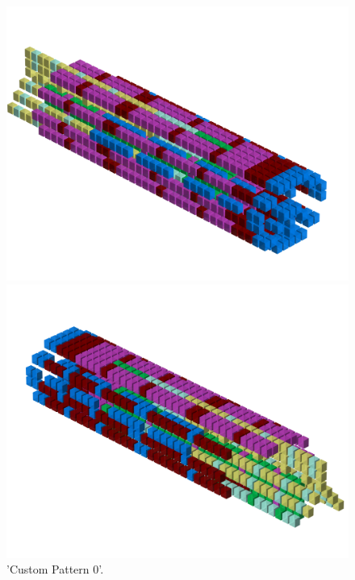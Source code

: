 \begin{minipage}[b]{0.48\linewidth}
\begin{figure}[H]
    \centering
    \begin{adjustbox}{width=6cm,margin=0cm 0cm}
      \includegraphics[width=12cm]{src/patterns/pattern8-45.png}%
    \end{adjustbox}
    \begin{adjustbox}{width=6cm,margin=0cm -1.8cm}
      \includegraphics[width=12cm]{src/patterns/pattern8-225.png}%
    \end{adjustbox}
\caption{'Custom Pattern 0'.}
\end{figure}
\end{minipage}
